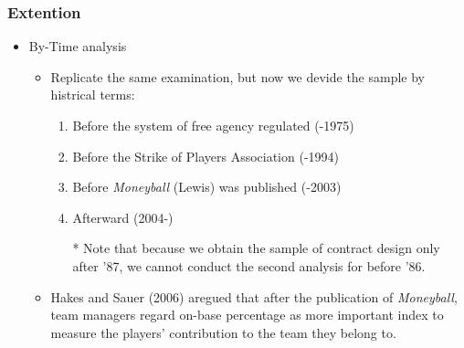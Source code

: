 \documentclass[dvipdfmx,12pt]{beamer}
\begin{document}
\begin{frame}\frametitle{Extention}
  \begin{itemize}
    \item By-Time analysis
    \begin{itemize}
      \item Replicate the same examination, but now we devide the sample by histrical terms:
      \begin{enumerate}
        \item Before the system of free agency regulated (-1975)

        \item Before the Strike of Players Association (-1994)

        \item Before \textit{Moneyball} (Lewis) was published (-2003)

        \item Afterward (2004-)

        * Note that because we obtain the sample of contract design only after '87, we cannot conduct the second analysis for before '86.
      \end{enumerate}

      \item Hakes and Sauer (2006) aregued that after the publication of \textit{Moneyball}, team managers regard on-base percentage as more important index to measure the players' contribution to the team they belong to.

    \end{itemize}
  \end{itemize}

\end{frame}
\end{document}
